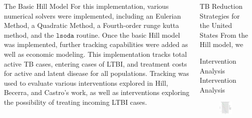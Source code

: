 \documentclass[final]{beamer}
\begin{document}
\begin{frame}
\begin{columns}
\begin{column}{.3\textwidth}
\begin{block}{The Basic Hill Model}
        For this implementation, various numerical solvers were implemented,
        including an Eulerian Method, a Quadratic Method, a Fourth-order runge
        kutta method, and the $\texttt{lsoda}$ routine. Once the basic Hill
        model was implemented, further tracking capabilities were added as well
        as economic modeling. This implementation tracks total active TB cases,
        entering cases of LTBI, and treatment costs for active and latent disease
        for all populations. Tracking was used to evaluate various interventions
        explored in Hill, Becerra, and Castro's work, as well as interventions
        exploring the possibility of treating incoming LTBI cases.
      \end{block}
    \end{column}
    
    \begin{column}{.3\textwidth}
      \begin{block}{TB Reduction Strategies for the United States}
        From the Hill model, we 
      \end{block}
      \begin{block}{Intervention Analysis}
        Intervention Analysis
        \begin{figure}[h]
          \begin{center}
            \includegraphics[scale=1]{incidencePlotRedEnLTBI.pdf}

\end{center}
\end{figure}
\end{block}
\end{column}
\end{columns}
\end{frame}
\end{document}
